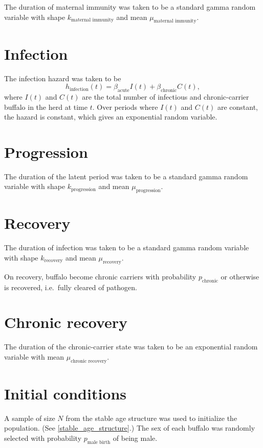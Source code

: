 \documentclass[12pt]{article}
\begin{document}
The duration of maternal immunity was taken to be a standard gamma
random variable with shape $k_{\text{maternal immunity}}$
and mean $\mu_{\text{maternal immunity}}$.


\section{Infection}

The infection hazard was taken to be
\begin{equation}
  h_{\text{infection}}(t) = \beta_{\text{acute}} I(t) +
  \beta_{\text{chronic}} C(t),
\end{equation}
where $I(t)$ and $C(t)$ are the total number of infectious and
chronic-carrier buffalo in the herd at time $t$.  Over periods where
$I(t)$ and $C(t)$ are constant, the hazard is constant, which gives an
exponential random variable.


\section{Progression}

The duration of the latent period was taken to be a standard gamma
random variable with shape $k_{\text{progression}}$
and mean $\mu_{\text{progression}}$.


\section{Recovery}

The duration of infection was taken to be a standard gamma random
variable with shape $k_{\text{recovery}}$ and mean
$\mu_{\text{recovery}}$.

On recovery, buffalo become chronic carriers with probability
$p_{\text{chronic}}$ or otherwise is recovered, i.e.~fully cleared
of pathogen.


\section{Chronic recovery}

The duration of the chronic-carrier state was taken to be an
exponential random variable with mean
$\mu_{\text{chronic recovery}}$.


\section{Initial conditions}

A sample of size $N$ from the stable age structure was used to
initialize the population.  (See \autoref{stable_age_structure}.)  The
sex of each buffalo was randomly selected with probability
$p_{\text{male birth}}$ of being male.
\end{document}
